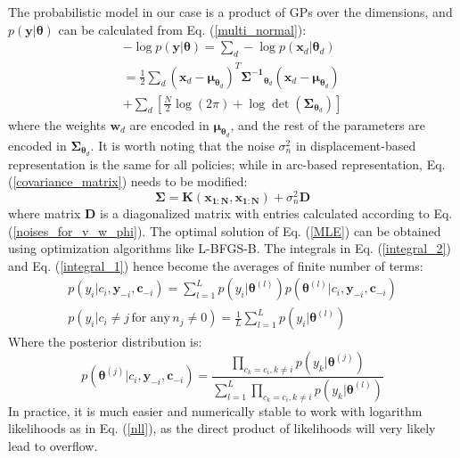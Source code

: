 \documentclass[journal]{IEEEtran}
\begin{document}
The probabilistic model in our case is a product of GPs over the dimensions, and $p(\bm{y}|\bm{\theta})$ can be calculated from Eq. (\ref{multi_normal}):
\begin{equation}
\begin{gathered}
-\log p(\bm{y}|\bm{\theta}) = \sum_{d} -\log p(\bm{x}_{d}|\bm{\theta}_d)
\\
= \frac{1}{2} \sum_{d}
(\bm{x}_{ d} - \bm{\mu}_{\bm{\theta}_d})^T \bm{\Sigma^{-1}}_{\bm{\theta}_d} (\bm{x}_{d} - \bm{\mu}_{\bm{\theta}_d})
\\ + \sum_{ d} \left[ \frac{N}{2}\log(2\pi) 
+ \log \det(\bm{\Sigma}_{ \bm{\theta}_d}) \right]
\end{gathered}
\label{nll}
\end{equation}
where the weights $\bm{w}_d$ are encoded in $\bm{\mu}_{\bm{\theta}_d}$, and the rest of the parameters are encoded in $\bm{\Sigma}_{\bm{\theta}_d}$.
It is worth noting that the noise $\sigma_n^2$ in displacement-based representation is the same for all policies; while in arc-based representation, Eq. (\ref{covariance_matrix}) needs to be modified:
\begin{equation}
\bm{\Sigma} = \bm{K}(\bm{x_{1:N}}, \bm{x_{1:N}}) + \sigma_{n}^2 \bm{D}
\label{modified_covariance_matrix}
\end{equation}
where matrix $\bm{D}$ is a diagonalized matrix with entries calculated according to Eq. (\ref{noises_for_v_w_phi}).
The optimal solution of Eq. (\ref{MLE}) can be obtained using optimization algorithms like L-BFGS-B. The integrals in Eq. (\ref{integral_2}) and Eq. (\ref{integral_1}) hence become the averages of finite number of terms:
\begin{equation}
\begin{gathered}
p(y_i|c_i, \bm{y}_{-i}, \bm{c}_{-i}) = 
\sum_{l=1}^L p(y_i|\bm{\theta}^{(l)})
p(\bm{\theta}^{(l)}|c_i, \bm{y}_{-i}, \bm{c}_{-i})
\\
p(y_i|c_i \neq j \, \text{for any} \, n_j \neq 0) = 
\frac{1}{L} \sum_{l=1}^L p(y_i|\bm{\theta}^{(l)})
\end{gathered}
\label{MC_prior_integral}
\end{equation}
Where the posterior distribution is:
\begin{equation}
p(\bm{\theta}^{(j)}|c_i, \bm{y}_{-i}, \bm{c}_{-i}) = 
\frac{
\prod_{c_k=c_i, k \neq i} p(y_k|\bm{\theta}^{(j)})}
{\sum_{l=1}^L \prod_{c_k=c_i, k \neq i} p(y_k|\bm{\theta}^{(l)})}
\label{MC_posterior}
\end{equation}
In practice, it is much easier and numerically stable to work with logarithm likelihoods as in Eq. (\ref{nll}), as the direct product of likelihoods will very likely lead to overflow.
\end{document}
